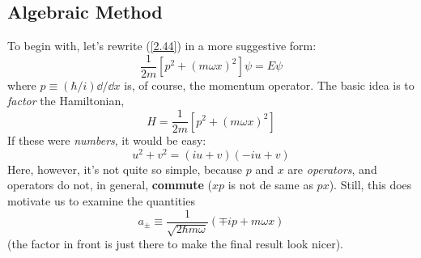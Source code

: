 \subsection{Algebraic Method}\label{sec:2.3.1}
To begin with, let's rewrite (\ref{2.44}) in a more suggestive form:
\begin{equation}\label{2.45}
	\frac{1}{2m}[p^2+(m\omega x)^2]\psi=E\psi
\end{equation}
where $p\equiv (\hbar/i)\dd /\dd x$ is, of course, the momentum operator. The basic idea is to \textit{factor} the Hamiltonian,
\begin{equation}\label{2.46}
	H=\frac{1}{2m}[p^2+(m\omega x)^2]
\end{equation}
If these were \textit{numbers}, it would be easy: $$u^2+v^2=(iu+v)(-iu+v)$$
Here, however, it's not quite so simple, because $p$ and $x$ are \textit{operators},  and operators do not, in general, \textbf{commute} ($xp$ is not de same as $px$). Still, this does motivate us to examine the quantities
\begin{equation}\label{2.47}
	\boxed{a_{\pm}\equiv\frac{1}{\sqrt{2\hbar m\omega}}(\mp ip+m\omega x)}
\end{equation}
(the factor in front is just there to make the final result look nicer).

